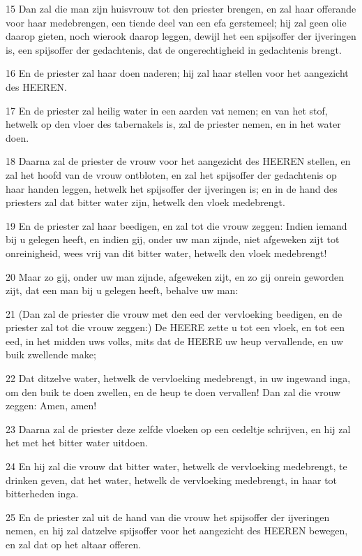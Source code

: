 \par 15 Dan zal die man zijn huisvrouw tot den priester brengen, en zal haar offerande voor haar medebrengen, een tiende deel van een efa gerstemeel; hij zal geen olie daarop gieten, noch wierook daarop leggen, dewijl het een spijsoffer der ijveringen is, een spijsoffer der gedachtenis, dat de ongerechtigheid in gedachtenis brengt.
\par 16 En de priester zal haar doen naderen; hij zal haar stellen voor het aangezicht des HEEREN.
\par 17 En de priester zal heilig water in een aarden vat nemen; en van het stof, hetwelk op den vloer des tabernakels is, zal de priester nemen, en in het water doen.
\par 18 Daarna zal de priester de vrouw voor het aangezicht des HEEREN stellen, en zal het hoofd van de vrouw ontbloten, en zal het spijsoffer der gedachtenis op haar handen leggen, hetwelk het spijsoffer der ijveringen is; en in de hand des priesters zal dat bitter water zijn, hetwelk den vloek medebrengt.
\par 19 En de priester zal haar beedigen, en zal tot die vrouw zeggen: Indien iemand bij u gelegen heeft, en indien gij, onder uw man zijnde, niet afgeweken zijt tot onreinigheid, wees vrij van dit bitter water, hetwelk den vloek medebrengt!
\par 20 Maar zo gij, onder uw man zijnde, afgeweken zijt, en zo gij onrein geworden zijt, dat een man bij u gelegen heeft, behalve uw man:
\par 21 (Dan zal de priester die vrouw met den eed der vervloeking beedigen, en de priester zal tot die vrouw zeggen:) De HEERE zette u tot een vloek, en tot een eed, in het midden uws volks, mits dat de HEERE uw heup vervallende, en uw buik zwellende make;
\par 22 Dat ditzelve water, hetwelk de vervloeking medebrengt, in uw ingewand inga, om den buik te doen zwellen, en de heup te doen vervallen! Dan zal die vrouw zeggen: Amen, amen!
\par 23 Daarna zal de priester deze zelfde vloeken op een cedeltje schrijven, en hij zal het met het bitter water uitdoen.
\par 24 En hij zal die vrouw dat bitter water, hetwelk de vervloeking medebrengt, te drinken geven, dat het water, hetwelk de vervloeking medebrengt, in haar tot bitterheden inga.
\par 25 En de priester zal uit de hand van die vrouw het spijsoffer der ijveringen nemen, en hij zal datzelve spijsoffer voor het aangezicht des HEEREN bewegen, en zal dat op het altaar offeren.
